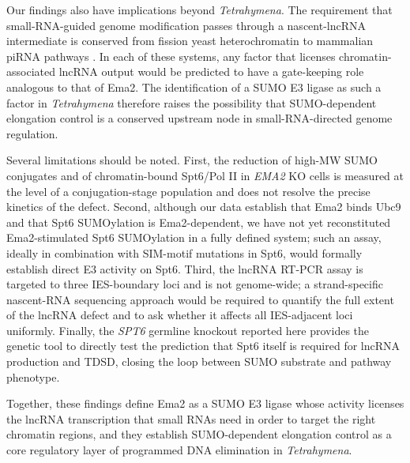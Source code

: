 \documentclass[11pt,a4paper]{article}
\begin{document}
Our findings also have implications beyond \textit{Tetrahymena}. The requirement that small-RNA-guided genome modification passes through a nascent-lncRNA intermediate is conserved from fission yeast heterochromatin to mammalian piRNA pathways \citep{Moazed2009,Holoch2015,Czech2018}. In each of these systems, any factor that licenses chromatin-associated lncRNA output would be predicted to have a gate-keeping role analogous to that of Ema2. The identification of a SUMO E3 ligase as such a factor in \textit{Tetrahymena} therefore raises the possibility that SUMO-dependent elongation control is a conserved upstream node in small-RNA-directed genome regulation.

Several limitations should be noted. First, the reduction of high-MW SUMO conjugates and of chromatin-bound Spt6/Pol II in \textit{EMA2} KO cells is measured at the level of a conjugation-stage population and does not resolve the precise kinetics of the defect. Second, although our data establish that Ema2 binds Ubc9 and that Spt6 SUMOylation is Ema2-dependent, we have not yet reconstituted Ema2-stimulated Spt6 SUMOylation in a fully defined system; such an assay, ideally in combination with SIM-motif mutations in Spt6, would formally establish direct E3 activity on Spt6. Third, the lncRNA RT-PCR assay is targeted to three IES-boundary loci and is not genome-wide; a strand-specific nascent-RNA sequencing approach would be required to quantify the full extent of the lncRNA defect and to ask whether it affects all IES-adjacent loci uniformly. Finally, the \textit{SPT6} germline knockout reported here provides the genetic tool to directly test the prediction that Spt6 itself is required for lncRNA production and TDSD, closing the loop between SUMO substrate and pathway phenotype.

Together, these findings define Ema2 as a SUMO E3 ligase whose activity licenses the lncRNA transcription that small RNAs need in order to target the right chromatin regions, and they establish SUMO-dependent elongation control as a core regulatory layer of programmed DNA elimination in \textit{Tetrahymena}.


\end{document}
